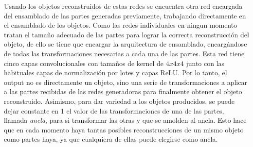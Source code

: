 \documentclass[spanish]{article}
\begin{document}
Usando los objetos reconstruidos de estas redes se encuentra otra red
encargada del ensamblado de las partes generadas previamente,
trabajando directamente en el ensamblado de los objetos.
Como las redes individuales en ningun momento tratan el tamaño
adecuado de las partes para lograr la correcta
reconstrucción del objeto, de ello se tiene que encargar la
arquitectura de ensamblado, encargándose de todas las
transformaciones necesarias a cada una de las partes. Esta
red tiene cinco capas convolucionales con tamaños de
kernel de \(4x4x4\) junto con las habituales capas de normalización
por lotes y capas ReLU. Por lo tanto, el output no es directamente
un objeto, sino una serie de transformaciones a aplicar a
las partes recibidas de las redes generadoras para finalmente obtener
el objeto reconstruido. Asimismo, para dar variedad a los objetos
producidos, se puede dejar constante en 1 el valor de las
transformaciones de una de las partes, llamada \textit{ancla}, para
si transformar las otras y que se amolden al ancla. Esto hace
que en cada momento haya tantas posibles reconstrucciones de un mismo
objeto como partes haya, ya que cualquiera de ellas puede elegirse
como ancla.

\end{document}
